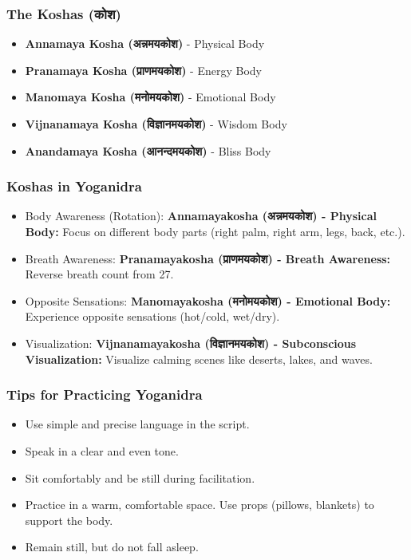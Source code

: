 \begin{frame}[fragile]\frametitle{The Koshas (कोश)}
    \begin{itemize}
        \item \textbf{Annamaya Kosha (अन्नमयकोश)} - Physical Body
        \item \textbf{Pranamaya Kosha (प्राणमयकोश)} - Energy Body
        \item \textbf{Manomaya Kosha (मनोमयकोश)} - Emotional Body
        \item \textbf{Vijnanamaya Kosha (विज्ञानमयकोश)} - Wisdom Body
        \item \textbf{Anandamaya Kosha (आनन्दमयकोश)} - Bliss Body
    \end{itemize}
\end{frame}

\begin{frame}[fragile]\frametitle{Koshas in Yoganidra}
    
    \begin{itemize}
        \item Body Awareness (Rotation): \textbf{Annamayakosha (अन्नमयकोश) - Physical Body:} Focus on different body parts (right palm, right arm, legs, back, etc.).
        \item Breath Awareness: \textbf{Pranamayakosha (प्राणमयकोश) - Breath Awareness:} Reverse breath count from 27.
        \item Opposite Sensations: \textbf{Manomayakosha (मनोमयकोश) - Emotional Body:} Experience opposite sensations (hot/cold, wet/dry).
        \item Visualization: \textbf{Vijnanamayakosha (विज्ञानमयकोश) - Subconscious Visualization:} Visualize calming scenes like deserts, lakes, and waves.
    \end{itemize}
\end{frame}

\begin{frame}[fragile]\frametitle{Tips for Practicing Yoganidra}
    \begin{itemize}
        \item Use simple and precise language in the script.
        \item Speak in a clear and even tone.
        \item Sit comfortably and be still during facilitation.
        \item Practice in a warm, comfortable space. Use props (pillows, blankets) to support the body.
        \item Remain still, but do not fall asleep.
    \end{itemize}
\end{frame}

